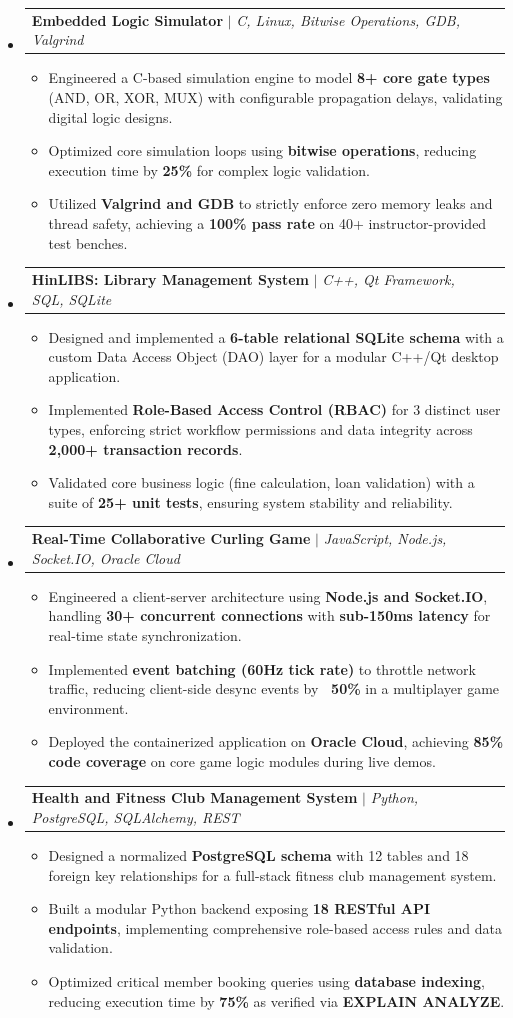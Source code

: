 \documentclass[letterpaper,11pt]{article}
\makeatletter
\newcommand{\resumeItem}[1]{
  \item\small{
    {#1 \vspace{-2pt}}
  }
}
\newcommand{\resumeProjectHeading}[2]{
    \item
    \begin{tabular*}{0.97\textwidth}{l@{\extracolsep{\fill}}r}
      \small#1 & #2 \\
    \end{tabular*}\vspace{-7pt}
}
\newcommand{\resumeSubHeadingListStart}{\begin{itemize}[leftmargin=0.15in, label={}]}
\newcommand{\resumeSubHeadingListEnd}{\end{itemize}}
\newcommand{\resumeItemListStart}{\begin{itemize}}
\newcommand{\resumeItemListEnd}{\end{itemize}\vspace{-5pt}}
\makeatother
\begin{document}
\resumeSubHeadingListStart
\resumeProjectHeading{\textbf{Embedded Logic Simulator} $|$ \emph{C, Linux, Bitwise Operations, GDB, Valgrind}}{} \n \resumeItemListStart \n \resumeItem{Engineered a C-based simulation engine to model \textbf{8+ core gate types} (AND, OR, XOR, MUX) with configurable propagation delays, validating digital logic designs.} \n \resumeItem{Optimized core simulation loops using \textbf{bitwise operations}, reducing execution time by \textbf{25\%} for complex logic validation.} \n \resumeItem{Utilized \textbf{Valgrind and GDB} to strictly enforce zero memory leaks and thread safety, achieving a \textbf{100\% pass rate} on 40+ instructor-provided test benches.} \n \resumeItemListEnd \n \vspace{6pt} \n \resumeProjectHeading{\textbf{HinLIBS: Library Management System} $|$ \emph{C++, Qt Framework, SQL, SQLite}}{} \n \resumeItemListStart \n \resumeItem{Designed and implemented a \textbf{6-table relational SQLite schema} with a custom Data Access Object (DAO) layer for a modular C++/Qt desktop application.} \n \resumeItem{Implemented \textbf{Role-Based Access Control (RBAC)} for 3 distinct user types, enforcing strict workflow permissions and data integrity across \textbf{2,000+ transaction records}.} \n \resumeItem{Validated core business logic (fine calculation, loan validation) with a suite of \textbf{25+ unit tests}, ensuring system stability and reliability.} \n \resumeItemListEnd \n \vspace{6pt} \n \resumeProjectHeading{\textbf{Real-Time Collaborative Curling Game} $|$ \emph{JavaScript, Node.js, Socket.IO, Oracle Cloud}}{} \n \resumeItemListStart \n \resumeItem{Engineered a client-server architecture using \textbf{Node.js and Socket.IO}, handling \textbf{30+ concurrent connections} with \textbf{sub-150ms latency} for real-time state synchronization.} \n \resumeItem{Implemented \textbf{event batching (60Hz tick rate)} to throttle network traffic, reducing client-side desync events by \textbf{~50\%} in a multiplayer game environment.} \n \resumeItem{Deployed the containerized application on \textbf{Oracle Cloud}, achieving \textbf{85\% code coverage} on core game logic modules during live demos.} \n \resumeItemListEnd \n \vspace{6pt} \n \resumeProjectHeading{\textbf{Health and Fitness Club Management System} $|$ \emph{Python, PostgreSQL, SQLAlchemy, REST}}{} \n \resumeItemListStart \n \resumeItem{Designed a normalized \textbf{PostgreSQL schema} with 12 tables and 18 foreign key relationships for a full-stack fitness club management system.} \n \resumeItem{Built a modular Python backend exposing \textbf{18 RESTful API endpoints}, implementing comprehensive role-based access rules and data validation.} \n \resumeItem{Optimized critical member booking queries using \textbf{database indexing}, reducing execution time by \textbf{75\%} as verified via \textbf{EXPLAIN ANALYZE}.} \n \resumeItemListEnd
\resumeSubHeadingListEnd
\end{document}
